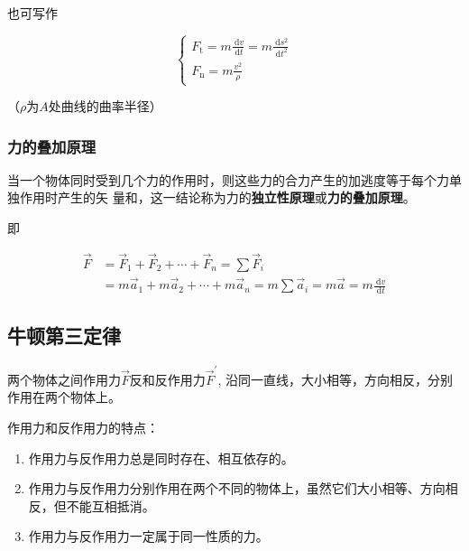 \documentclass[
	12pt, %
	a4paper, %
]{myLegrandOrangeBook}
\begin{document}
    也可写作

    \begin{equation}
        \left\{\begin{array}{l}
        F_{\mathrm{t}}=m \frac{\mathrm{~d} v}{\mathrm{~d} t}=m \frac{\mathrm{~d} s^2}{\mathrm{~d} t^2} \\
        F_{\mathrm{n}}=m \frac{v^2}{\rho}
        \end{array}\right.
    \end{equation}

    （\(\rho\)为\(A\)处曲线的曲率半径）

\subsubsection*{力的叠加原理}

    当一个物体同时受到几个力的作用时，则这些力的合力产生的加逃度等于每个力单独作用时产生的矢
    量和，这一结论称为力的\textbf{独立性原理}或\textbf{力的叠加原理}。

    即

    \begin{equation}
        \begin{aligned}
        \overrightarrow{F} & =\overrightarrow{F}_1+\overrightarrow{F}_2+\cdots+\overrightarrow{F}_n=\sum \overrightarrow{F}_i \\
        & =m \overrightarrow{a}_1+m \overrightarrow{a}_2+\cdots+m \overrightarrow{a}_n=m \sum \overrightarrow{a}_i=m \overrightarrow{a}=m \frac{\mathrm{~d} v}{\mathrm{~d} t}
        \end{aligned}
    \end{equation}

\subsection{牛顿第三定律}

    两个物体之间作用力\(\overrightarrow{F}\)反和反作用力\(\overrightarrow{F}^{'}\), 
    沿同一直线，大小相等，方向相反，分别作用在两个物体上。

    作用力和反作用力的特点：

    \begin{enumerate}
        \item 作用力与反作用力总是同时存在、相互依存的。
        \item 作用力与反作用力分别作用在两个不同的物体上，虽然它们大小相等、方向相反，但不能互相抵消。
        \item 作用力与反作用力一定属于同一性质的力。
    \end{enumerate}
\end{document}
